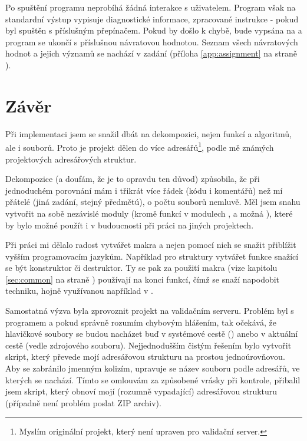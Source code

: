 \documentclass[czech, kiv, he, sem, pdf, viewonly]{fasthesis}
\begin{document}
Po spuštění programu neprobíhá žádná interakce s uživatelem. Program však na
standardní výstup vypisuje diagnostické informace, zpracované instrukce - pokud
byl spuštěn s příslušným přepínačem. Pokud by došlo k chybě, bude vypsána na
 a program se ukončí s příslušnou návratovou hodnotou. Seznam
všech návratových hodnot a jejich významů se nachází v zadání (příloha
\ref{app:assignment} na straně \pageref{app:assignment}).

\chapter{Závěr}

Při implementaci jsem se snažil dbát na dekompozici, nejen funkcí a algoritmů,
ale i souborů. Proto je projekt dělen do více adresářů\footnote{Myslím
originální projekt, který není upraven pro validační server.}, podle mě známých
projektových adresářových struktur.

Dekompozice (a doufám, že je to opravdu ten důvod) způsobila, že při jednoduchém
porovnání mám i třikrát více řádek (kódu i komentářů) než mí přátelé (jiná
zadání, stejný předmětú), o počtu souborů nemluvě. Měl jsem snahu vytvořit na
sobě nezávislé moduly (kromě funkcí v modulech ,
 a možná ), které by bylo možné použít i v
budoucnosti při práci na jiných projektech.

Při práci mi dělalo radost vytvářet makra a nejen pomocí nich se snažit
přiblížit vyšším programovacím jazykům. Například pro struktury vytvářet funkce
snažící se být konstruktor či destruktor. Ty se pak za použití makra
 (vize kapitolu \ref{sec:common} na straně
\pageref{sec:common}) používají na konci funkcí, čímž se snaží napodobit
 techniku, hojně využívanou například v .

Samostatná výzva byla zprovoznit projekt na validačním serveru. Problém byl s
programem  a pokud správně rozumím chybovým hlášením, tak očekává,
že hlavičkové soubory se budou nacházet buď v systémové cestě ()
anebo v aktuální cestě (vedle zdrojového souboru). Nejjednodušším čistým řešením
bylo vytvořit skript, který převede mojí adresářovou strukturu na prostou
jednoúrovňovou. Aby se zabránilo jmenným kolizím, upravuje se název souboru
podle adresářů, ve kterých se nachází. Tímto se omlouvám za způsobené vrásky při
kontrole, přibalil jsem skript, který obnoví mojí (rozumně vypadající)
adresářovou strukturu (případně není problém poslat ZIP archiv).
\end{document}
